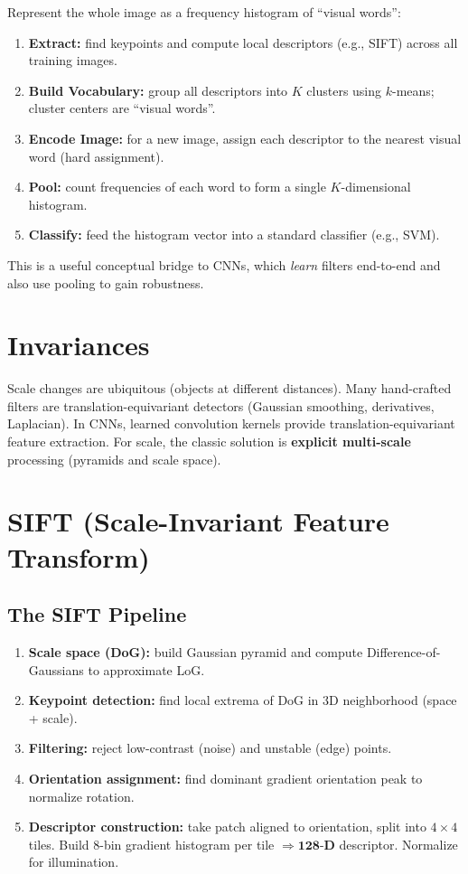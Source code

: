\documentclass[11pt, oneside]{book}
\begin{document}
\begin{thmbox}[title={BoVW Pipeline}]
Represent the whole image as a frequency histogram of ``visual words'':
\begin{enumerate}
  \item \textbf{Extract:} find keypoints and compute local descriptors (e.g., SIFT) across all training images.
  \item \textbf{Build Vocabulary:} group all descriptors into $K$ clusters using $k$-means; cluster centers are ``visual words''.
  \item \textbf{Encode Image:} for a new image, assign each descriptor to the nearest visual word (hard assignment).
  \item \textbf{Pool:} count frequencies of each word to form a single $K$-dimensional histogram.
  \item \textbf{Classify:} feed the histogram vector into a standard classifier (e.g., SVM).
\end{enumerate}
\end{thmbox}

This is a useful conceptual bridge to CNNs, which \emph{learn} filters end-to-end and also use pooling to gain robustness.

\section{Invariances}

Scale changes are ubiquitous (objects at different distances). Many hand-crafted filters are translation-equivariant
detectors (Gaussian smoothing, derivatives, Laplacian). In CNNs, learned convolution kernels provide
translation-equivariant feature extraction. For scale, the classic solution is \textbf{explicit multi-scale}
processing (pyramids and scale space).

\section{SIFT (Scale-Invariant Feature Transform)}

\subsection{The SIFT Pipeline}

\begin{enumerate}
  \item \textbf{Scale space (DoG):} build Gaussian pyramid and compute Difference-of-Gaussians to approximate LoG.
  \item \textbf{Keypoint detection:} find local extrema of DoG in 3D neighborhood (space + scale).
  \item \textbf{Filtering:} reject low-contrast (noise) and unstable (edge) points.
  \item \textbf{Orientation assignment:} find dominant gradient orientation peak to normalize rotation.
  \item \textbf{Descriptor construction:} take patch aligned to orientation, split into $4\times4$ tiles. Build 8-bin gradient histogram per tile $\Rightarrow \mathbf{128\text{-D}}$ descriptor. Normalize for illumination.
\end{enumerate}
\end{document}
